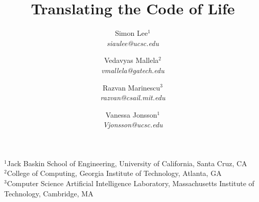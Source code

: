 \title{Translating the Code of Life}

\author{
\hspace{-.8cm}Simon Lee$^1$\\
\hspace{-.8cm}\emph{siaulee@ucsc.edu}
\and
\hspace{-.5cm}Vedavyas Mallela$^2$\\
\hspace{-.5cm}\emph{vmallela@gatech.edu}
\and 
Razvan Marinescu$^3$\\
\emph{razvan@csail.mit.edu}
\and
\hspace{-.8cm}Vanessa Jonsson$^1$\\
\hspace{-.8cm}\emph{Vjonsson@ucsc.edu}
}\date{}
\maketitle 
\vspace{-.8cm}
\begin{center}
$^1$Jack Baskin School of Engineering, University of California, Santa Cruz, CA\\
$^2$College of Computing, Georgia Institute of Technology, Atlanta, GA\\
$^3$Computer Science Artificial Intelligence Laboratory,  Massachusetts Institute of Technology, Cambridge, MA 
\end{center}
